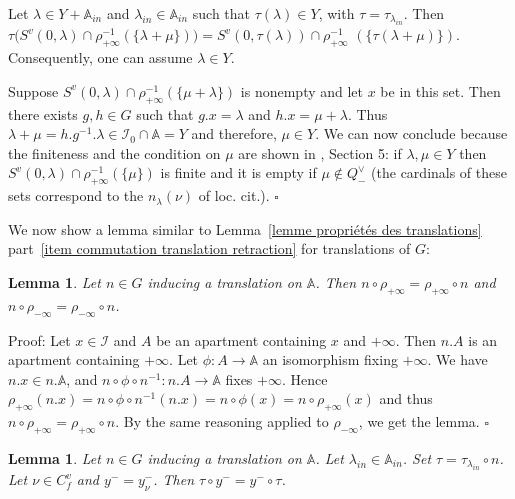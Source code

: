 \documentclass[12pt]{article}
\theoremstyle{plain}
\newtheorem{lemme}[thm]{Lemma}
\theoremstyle{definition}
\newcommand{\A}{\mathbb{A}}
\newcommand{\I}{\mathcal{I}}
\begin{document}
Let $\lambda\in Y+\A_{in}$ and $\lambda_{in}\in \A_{in}$ such that $\tau(\lambda)\in Y$, 
with $\tau=\tau_{\lambda_{in}}$. Then 
$\tau\big(S^v(0,\lambda)\cap\rho_{+\infty}^{-1}(\{\lambda+\mu\})\big)=S^v(0,\tau(\lambda))\cap\rho_{+\infty}^{-1}$ $(\{\tau(\lambda+\mu )\})$. Consequently, one can assume $\lambda\in Y$. 

Suppose $S^v(0,\lambda)\cap \rho_{+\infty}^{-1}(\{\mu+\lambda\})$ is nonempty and let $x$ be in this set. Then there exists $g,h\in G$ such that $g.x=\lambda$ and $h.x=\mu+\lambda$. Thus $\lambda+\mu=h.g^{-1}.\lambda\in \I_0\cap \A=Y$ and therefore, $\mu\in Y$. We can now conclude because the finiteness and the condition on  $\mu$ are shown in \cite{gaussent2014spherical}, Section 5: if $\lambda, \mu\in Y$ then $S^v(0,\lambda)\cap \rho_{+\infty}^{-1}(\{\mu\})$ is finite and it is empty if $\mu\notin Q^\vee_-$ (the cardinals of these sets correspond to the $n_\lambda(\nu)$ of loc. cit.).
$\square$

\vspace{3mm}

We now show a lemma similar to Lemma~\ref{lemme propriétés des translations} part~\ref{item commutation translation retraction} for translations of $G$: 

\begin{lemme}\label{lemme commutation des translations et rétractions}
Let $n\in G$ inducing a translation on $\A$. Then $n\circ\rho_{+\infty}=\rho_{+\infty}\circ n$ and $n\circ \rho_{-\infty}=\rho_{-\infty}\circ n$.
\end{lemme}

Proof: 
Let $x\in\mathcal{I}$ and $A$ be an apartment containing $x$ and $+\infty$. Then $n.A$ is an apartment containing $+\infty$. Let $\phi:A\rightarrow \mathbb{A}$ an isomorphism fixing $+\infty$. We have $n.x\in n.\mathbb{A}$, and $n\circ\phi\circ n^{-1}:n.A\rightarrow \mathbb{A}$ fixes $+\infty$. Hence $\rho_{+\infty}(n.x)=n\circ\phi\circ n^{-1}(n.x)=n\circ\phi(x)=n\circ\rho_{+\infty}(x)$ and thus $n\circ \rho_{+\infty}=\rho_{+\infty}\circ n$. By the same reasoning applied to $\rho_{-\infty}$, we get the lemma. $\square$
 
 
 

\begin{lemme}\label{lemme y- des translatés}
Let $n\in G$ inducing a translation on $\mathbb{A}$. Let $\lambda_{in}\in \A_{in}$. Set $\tau=\tau_{\lambda_{in}}\circ n$. Let $\nu\in C_f^v$ and $y^-=y_\nu^-$. Then $\tau\circ y^-=y^-\circ \tau$.
\end{lemme}
\end{document}
